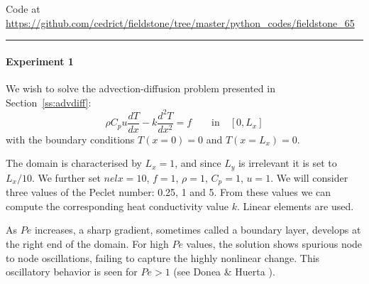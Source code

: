 

\begin{center}
Code at \url{https://github.com/cedrict/fieldstone/tree/master/python_codes/fieldstone_65}
\end{center}

\par\noindent\rule{\textwidth}{0.4pt}


\paragraph{Experiment 1}
We wish to solve the advection-diffusion problem presented in 
Section~\ref{ss:advdiff}:
\begin{equation}
\rho C_p u \frac{dT}{dx} - k \frac{d^2T}{dx^2} = f \qquad \text{in} \quad [0,L_x]
\end{equation}
with the boundary conditions $T(x=0)=0$ and $T(x=L_x)=0$.

The domain is characterised by $L_x=1$, and since $L_y$ is irrelevant it is set to $L_x/10$.
We further set $nelx=10$, $f=1$, $\rho=1$, $C_p=1$, $u=1$.
We will consider three values of the Peclet number: 0.25, 1 and 5.
From these values we can compute the corresponding heat conductivity value $k$.
Linear elements are used.

As $Pe$ increases, a sharp gradient, sometimes called a boundary layer,
develops at the right end of the domain. For high $Pe$ values, the solution shows 
spurious node to node oscillations, failing to capture the highly nonlinear change. This oscillatory
behavior is seen for $Pe>1$ (see Donea \& Huerta \cite{dohu03}).

